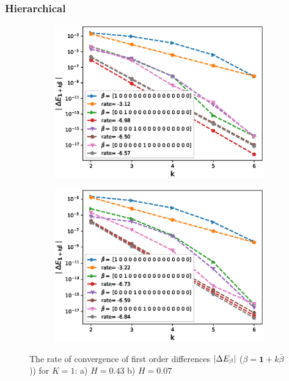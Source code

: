 \documentclass[11pt]{article}
\begin{document}
\newpage
\subsubsection{Hierarchical}
\begin{figure}[h!]
	\centering
	\begin{subfigure}{.5\textwidth}
		\centering
		\includegraphics[width=1\linewidth]{./figures/effect_H_differences/hierarchical/H_043/N_8/first_difference_rbergomi_8steps_H_043_K_1_hierarch_with_rate_W1.eps}
		\caption{}
		\label{fig:sub3}
	\end{subfigure}%
	\begin{subfigure}{.5\textwidth}
		\centering
		\includegraphics[width=1\linewidth]{./figures/effect_H_differences/hierarchical/H_007/N_8/first_difference_rbergomi_8steps_H_007_K_1_hierarch_with_rate_W1.eps}
		\caption{}
		\label{fig:sub4}
	\end{subfigure}
	
	\caption{The rate of convergence of  first order differences $\left\lvert\Delta E_{\beta}\right\rvert$ ($\beta=\mathbf{1}+k \bar{\beta}$)) for $K=1$: a) $H=0.43$ b)  $H=0.07$}
	\label{fig:test2}
\end{figure}
\end{document}
